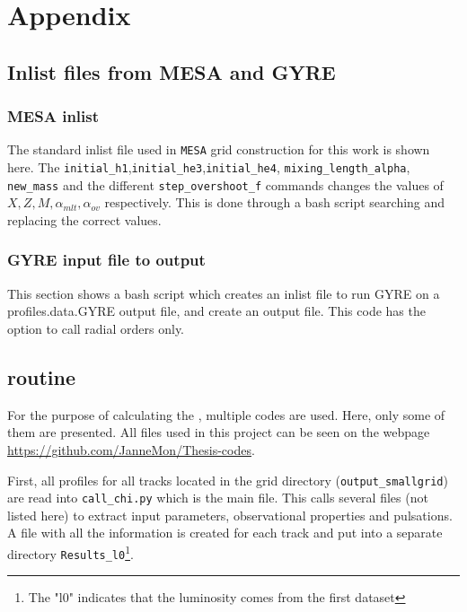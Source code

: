 \chapter{Appendix}
\section{Inlist files from MESA and GYRE}
\label{inlist}

\subsection{MESA inlist}

The standard inlist file used in \texttt{MESA} grid construction for this work is shown here. The \texttt{initial\_h1},\texttt{initial\_he3},\texttt{initial\_he4}, \texttt{mixing\_length\_alpha}, \texttt{new\_mass} and the different \texttt{step\_overshoot\_f} commands changes the values of $X,Z,M,\alpha_{mlt},\alpha_{ov}$ respectively. This is done through a bash script searching and replacing the correct values. 



\subsection{GYRE input file to output}

This section shows a bash script which creates an inlist file to run GYRE on a profiles.data.GYRE output file, and create an output file. This code has the option to call radial orders only.


\section{\chis routine}
\label{chisroutine}

For the purpose of calculating the \chis, multiple codes are used. Here, only some of them are presented. All files used in this project can be seen on the webpage \url{https://github.com/JanneMon/Thesis-codes}. 

First, all profiles for all tracks located in the grid directory (\texttt{output\_smallgrid}) are read into \texttt{call\_chi.py} which is the main file. This calls several files (not listed here) to extract input parameters, observational properties and pulsations.  A file with all the information is created for each track and put into a separate directory \texttt{Results\_l0}\footnote{The "l0" indicates that the luminosity comes from the first dataset}. 


